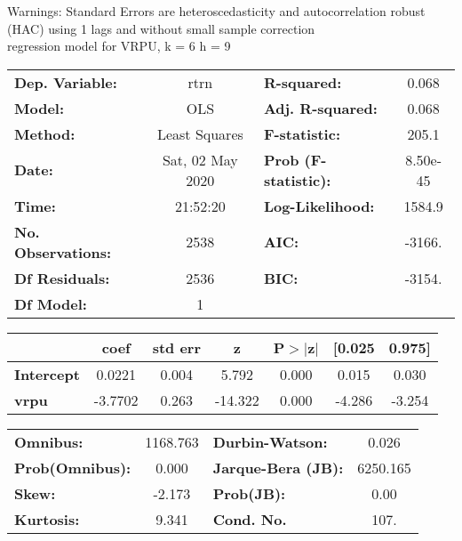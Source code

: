 Warnings: \newline
 [1] Standard Errors are heteroscedasticity and autocorrelation robust (HAC) using 1 lags and without small sample correction\\ 

regression model for VRPU, k = 6 h = 9\begin{center}
\begin{tabular}{lclc}
\toprule
\textbf{Dep. Variable:}    &       rtrn       & \textbf{  R-squared:         } &     0.068   \\
\textbf{Model:}            &       OLS        & \textbf{  Adj. R-squared:    } &     0.068   \\
\textbf{Method:}           &  Least Squares   & \textbf{  F-statistic:       } &     205.1   \\
\textbf{Date:}             & Sat, 02 May 2020 & \textbf{  Prob (F-statistic):} &  8.50e-45   \\
\textbf{Time:}             &     21:52:20     & \textbf{  Log-Likelihood:    } &    1584.9   \\
\textbf{No. Observations:} &        2538      & \textbf{  AIC:               } &    -3166.   \\
\textbf{Df Residuals:}     &        2536      & \textbf{  BIC:               } &    -3154.   \\
\textbf{Df Model:}         &           1      & \textbf{                     } &             \\
\bottomrule
\end{tabular}
\begin{tabular}{lcccccc}
                   & \textbf{coef} & \textbf{std err} & \textbf{z} & \textbf{P$> |$z$|$} & \textbf{[0.025} & \textbf{0.975]}  \\
\midrule
\textbf{Intercept} &       0.0221  &        0.004     &     5.792  &         0.000        &        0.015    &        0.030     \\
\textbf{vrpu}      &      -3.7702  &        0.263     &   -14.322  &         0.000        &       -4.286    &       -3.254     \\
\bottomrule
\end{tabular}
\begin{tabular}{lclc}
\textbf{Omnibus:}       & 1168.763 & \textbf{  Durbin-Watson:     } &    0.026  \\
\textbf{Prob(Omnibus):} &   0.000  & \textbf{  Jarque-Bera (JB):  } & 6250.165  \\
\textbf{Skew:}          &  -2.173  & \textbf{  Prob(JB):          } &     0.00  \\
\textbf{Kurtosis:}      &   9.341  & \textbf{  Cond. No.          } &     107.  \\
\bottomrule
\end{tabular}
\end{center}

